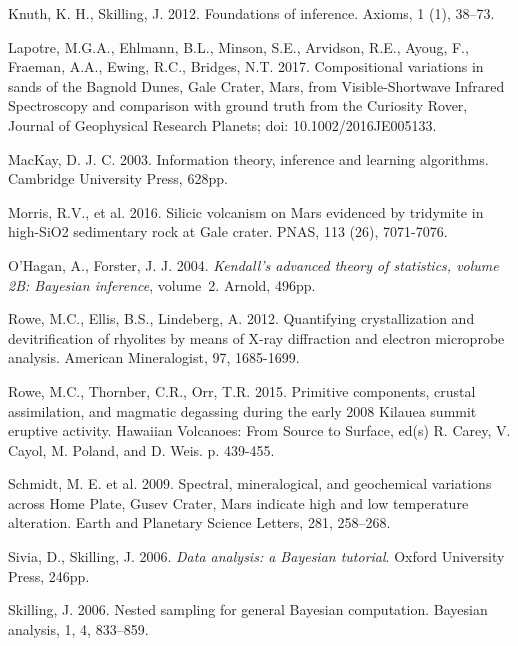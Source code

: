 \documentclass[review]{elsarticle}
\begin{document}
\begin{thebibliography}{99}
Knuth, K. H., Skilling, J. 2012.
\newblock Foundations of inference.
\newblock Axioms, 1 (1),  38--73.

Lapotre, M.G.A., Ehlmann, B.L., Minson, S.E., Arvidson, R.E., Ayoug, F., Fraeman, A.A., Ewing, R.C., Bridges, N.T. 2017. Compositional variations in sands of the Bagnold Dunes, Gale Crater, Mars, from Visible-Shortwave Infrared Spectroscopy and comparison with ground truth from the Curiosity Rover, Journal of Geophysical Research Planets; doi: 10.1002/2016JE005133.

MacKay, D. J. C. 2003. Information theory, inference and learning algorithms. Cambridge University Press, 628pp.

Morris, R.V., et al. 2016. Silicic volcanism on Mars evidenced by tridymite in high-SiO2 sedimentary rock at Gale crater. PNAS, 113 (26), 7071-7076.

O'Hagan, A., Forster, J. J. 2004.
\newblock \emph{Kendall's advanced theory of statistics, volume 2B: Bayesian
  inference}, volume~2.
\newblock Arnold, 496pp.

Rowe, M.C., Ellis, B.S., Lindeberg, A. 2012. Quantifying crystallization and devitrification of rhyolites by means of X-ray diffraction and electron microprobe analysis. American Mineralogist, 97, 1685-1699.


Rowe, M.C., Thornber, C.R., Orr, T.R. 2015. Primitive components, crustal assimilation, and magmatic degassing during the early 2008 Kilauea summit eruptive activity. Hawaiian Volcanoes: From Source to Surface, ed(s) R. Carey, V. Cayol, M. Poland, and D. Weis. p. 439-455.

Schmidt, M. E. et al. 2009. Spectral, mineralogical, and geochemical variations across Home Plate, Gusev Crater, Mars indicate high and low temperature alteration. Earth and Planetary Science Letters, 281, 258–268.

Sivia, D., Skilling, J. 2006.
\newblock \emph{Data analysis: a Bayesian tutorial}.
\newblock Oxford University Press, 246pp.

Skilling, J. 2006. Nested sampling for general Bayesian computation.
Bayesian analysis, 1, 4, 833--859.


\end{thebibliography}
\end{document}
